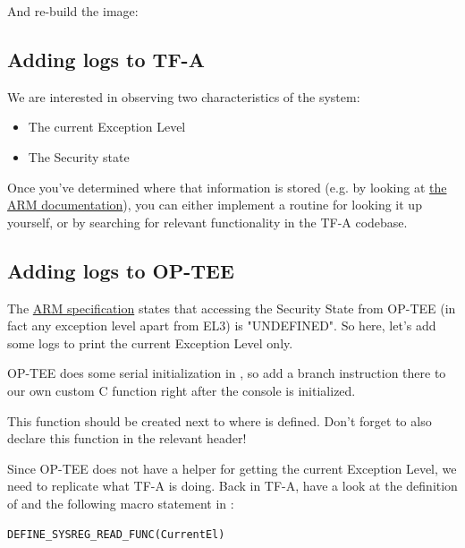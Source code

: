 And re-build the image:

\subsection{Adding logs to TF-A}

We are interested in observing two characteristics of the system:
\begin{itemize}
  \item The current Exception Level
  \item The Security state
\end{itemize}
Once you've determined where that information is stored (e.g. by looking at
\href{}{the ARM documentation}), you can either implement a routine for looking it up
yourself, or by searching for relevant functionality in the TF-A codebase.

\subsection{Adding logs to OP-TEE}

The \href{https://support.arm.com/documentation/ddi0595/2021-06/AArch64-Registers/SCR-EL3--Secure-Configuration-Register}{ARM specification}
states that accessing the Security State from OP-TEE (in fact any
exception level apart from EL3) is "UNDEFINED". So here, let's add some logs to
print the current Exception Level only.

OP-TEE does some serial initialization in
, so add a branch instruction there to
our own custom C function right after the console is initialized.

This function should be created next to where  is
defined. Don't forget to also declare this function in the relevant header!

Since OP-TEE does not have a helper for getting the current Exception Level, we
need to replicate what TF-A is doing. Back in TF-A, have a look at the
definition of  and the following macro statement in
:

\begin{verbatim}
DEFINE_SYSREG_READ_FUNC(CurrentEl)
\end{verbatim}

